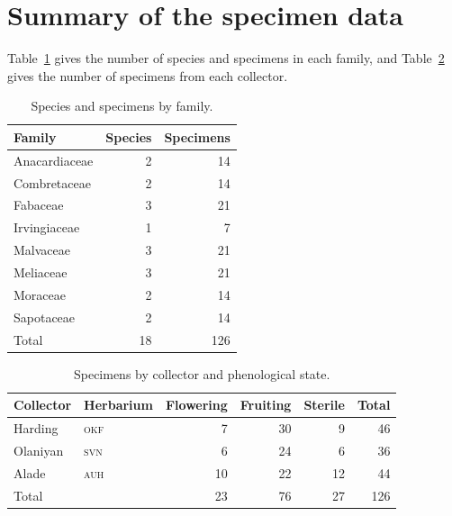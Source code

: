 \section{Summary of the specimen data}
Table~\ref{tab:family-summary} gives the number of species and
specimens in each family, and Table~\ref{tab:collector-summary} gives
the number of specimens from each collector.

\begin{table}[htbp]
	\centering
	\caption{Species and specimens by family.}
	\label{tab:family-summary}
	\begin{tabular}{@{}lrr@{}}
		\toprule
		Family & Species & Specimens \\
		\midrule
		Anacardiaceae & 2 & 14 \\
		Combretaceae  & 2 & 14 \\
		Fabaceae      & 3 & 21 \\
		Irvingiaceae  & 1 &   7 \\
		Malvaceae     & 3 & 21 \\
		Meliaceae     & 3 & 21 \\
		Moraceae      & 2 & 14 \\
		Sapotaceae    & 2 & 14 \\
		\midrule
		Total         & 18 & 126 \\
		\bottomrule
	\end{tabular}
\end{table}

\begin{table}[htbp]
	\centering
	\caption{Specimens by collector and phenological state.}
	\label{tab:collector-summary}
	\begin{tabular}{@{}llrrrr@{}}
		\toprule
		Collector & Herbarium & Flowering & Fruiting & Sterile & Total \\
		\midrule
		Harding   & \textsc{okf} &  7 & 30 &  9 & 46 \\
		Olaniyan  & \textsc{svn} &  6 & 24 &  6 & 36 \\
		Alade     & \textsc{auh} & 10 & 22 & 12 & 44 \\
		\midrule
		Total     &              & 23 & 76 & 27 & 126 \\
		\bottomrule
	\end{tabular}
\end{table}
